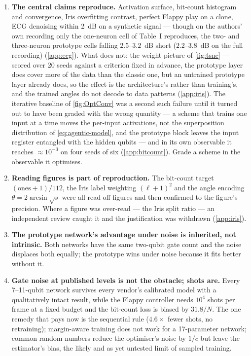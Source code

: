 \begin{enumerate}
\item \textbf{The central claims reproduce.}  Activation surface, bit-count histogram and
convergence, Iris overfitting contrast, perfect Flappy play on a clone, ECG denoising within
2~dB on a synthetic signal --- though on the authors' own recording only the one-neuron cell of
Table~I reproduces, the two- and three-neuron prototype cells falling $2.5$--$3.2$~dB short ($2.2$--$3.8$~dB on the full recording)
(\cref{app:ecg}).  What does not: the weight picture of \cref{fig:tsne} --- scored over 20
seeds against a criterion fixed in advance, the prototype layer does cover more of the data than
the classic one, but an untrained prototype layer already does, so the effect is the
architecture's rather than training's, and the trained angles do not decode to data patterns (\cref{app:iris}).  The iterative baseline of \cref{fig:OptConv} was a second such
failure until it turned out to have been graded with the wrong quantity --- a scheme that trains
one input at a time moves the per-input activations, not the superposition distribution of
\cref{eq:agentic-model}, and the prototype block leaves the input register entangled with the
hidden qubits --- and in its own observable it reaches $\approx10^{-3}$ on four seeds of six
(\cref{app:bitcount}).  Grade a scheme in the observable it optimises.

\item \textbf{Reading figures is part of reproduction.}  The bit-count target
$(\text{ones}+1)/112$, the Iris label weighting $(\ell+1)^2$ and the angle encoding
$\theta=2\arcsin\sqrt s$ were all read off figures and then confirmed to the figure's
precision.  Where a figure was over-read --- the Iris split ratio --- an independent review
caught it and the justification was withdrawn (\cref{app:iris}).

\item \textbf{The prototype network's advantage under noise is inherited, not intrinsic.}  Both
networks have the same two-qubit gate count and the noise displaces both equally; the prototype
wins under noise because it fits better without it.

\item \textbf{Gate noise at published levels is not the obstacle; shots are.}  Every
7--11-qubit network survives every vendor's calibrated model with a qualitatively intact
result, while the Flappy controller needs $10^4$ shots per frame at a fixed budget and the
bit-count loss is biased by $31.8/N$.  The one remedy that pays now is the sequential rule
($4.6\times$ fewer shots, no retraining); margin-aware training does not work for a
17-parameter network; common random numbers reduce the optimiser's noise by $1/c$ but leave the
estimator's bias, the likely and as yet untested limit of sampled training.


\end{enumerate}
